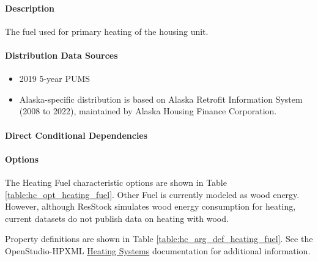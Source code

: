 \paragraph{Description}
% 
The fuel used for primary heating of the housing unit.

\paragraph{Distribution Data Sources}
% 
\begin{itemize}
    \item 2019 5-year PUMS 
    \item Alaska-specific distribution is based on Alaska Retrofit Information System (2008 to 2022), maintained by Alaska Housing Finance Corporation.
\end{itemize}

\paragraph{Direct Conditional Dependencies}


\paragraph{Options}
The Heating Fuel characteristic options are shown in Table \ref{table:hc_opt_heating_fuel}. Other Fuel is currently modeled as wood energy. However, although ResStock simulates wood energy consumption for heating, current datasets do not publish data on heating with wood.



Property definitions are shown in Table \ref{table:hc_arg_def_heating_fuel}. See the OpenStudio-HPXML \href{https://openstudio-hpxml.readthedocs.io/en/v1.10.0/workflow_inputs.html#hpxml-heating-systems}{Heating Systems} documentation for additional information.



